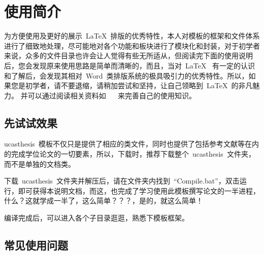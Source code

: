 
\chapter{使用简介}
\label{chap:guide}

为方便使用及更好的展示~\LaTeX{}~排版的优秀特性，本人对模板的框架和文件体系进行了细致地处理，尽可能地对各个功能和板块进行了模块化和封装，对于初学者来说，众多的文件目录也许会让人觉得有些无所适从，但阅读完下面的使用说明后，您会发现原来使用思路是简单而清晰的，而且，当对~\LaTeX{}~ 有一定的认识和了解后，会发现其相对~Word~类排版系统的极具吸引力的优秀特性。所以，如果您是初学者，请不要退缩，请稍加尝试和坚持，让自己领略到~\LaTeX{}~的非凡魅力。 并可以通过阅读相关资料如~ \citep{website:wikipedia}~ 来完善自己的使用知识。

\section{先试试效果}

ucasthesis~模板不仅只是提供了相应的类文件，同时也提供了包括参考文献等在内的完成学位论文的一切要素，所以，下载时，推荐下载整个~ucasthesis~文件夹，而不是单独的文档类。

下载~ucasthesis~文件夹并解压后，请在文件夹内找到~“Compile.bat”，双击运行，即可获得本说明文档，而这，也完成了学习使用此模板撰写论文的一半进程，什么？这就学成一半了，这么简单？？？，是的，就这么简单！

编译完成后，可以进入各个子目录逛逛，熟悉下模板框架。

\section{常见使用问题}


